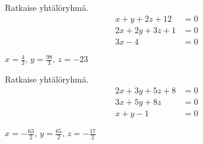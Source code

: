 \begin{tehtava}
    Ratkaise yhtälöryhmä.
    \begin{align*}
        x+y+2z+12 &= 0 \\
        2x+2y+3z+1 &=0 \\
        3x-4 &=0
    \end{align*}
    \begin{vastaus}
        $x = \frac{4}{3}, \, y = \frac{98}{3}, \, z = -23$
    \end{vastaus}
\end{tehtava}

\begin{tehtava}
    Ratkaise yhtälöryhmä.
    \begin{align*}
        2x+3y+5z+8 &= 0 \\
        3x+5y+8z &=0 \\
        x+y-1 &=0
    \end{align*}
    \begin{vastaus}
        $x = -\frac{63}{2}, \, y = \frac{65}{2}, \, z = -\frac{17}{2}$
    \end{vastaus}
\end{tehtava}
